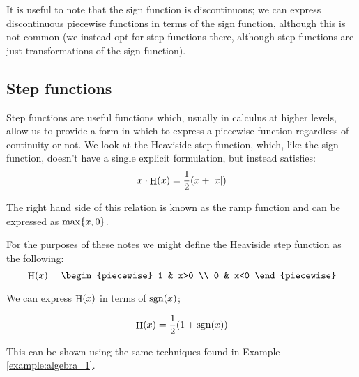 
It is useful to note that the sign function is discontinuous; we can express discontinuous piecewise functions in terms of the sign function, although this is not common (we instead opt for step functions there, although step functions are just transformations of the sign function).

\subsection{Step functions}
Step functions are useful functions which, usually in calculus at higher levels, allow us to provide a form in which to express a piecewise function regardless of continuity or not. We look at the Heaviside step function, which, like the sign function, doesn't have a single explicit formulation, but instead satisfies:
$$
    x\cdot\step{x}=\frac{1}{2}\paren*{x+\abs{x}}
$$

The right hand side of this relation is known as the ramp function and can be expressed as $\max\{x,0\}$.

For the purposes of these notes we might define the Heaviside step function as the following:
$$
    \step{x}=\begin{piecewise}
        1 & x>0 \\
        0 & x<0
    \end{piecewise}
$$

\begin{theorem}
    We can express $\mathrm{\mathop{H}}(x)$ in terms of $\mathrm{\mathop{sgn}}(x)$;

    $$
        \mathrm{\mathop{H}}(x)=\frac{1}{2}(1+\mathrm{\mathop{sgn}}(x))
    $$

    This can be shown using the same techniques found in Example \ref{example:algebra_1}.
\end{theorem}

